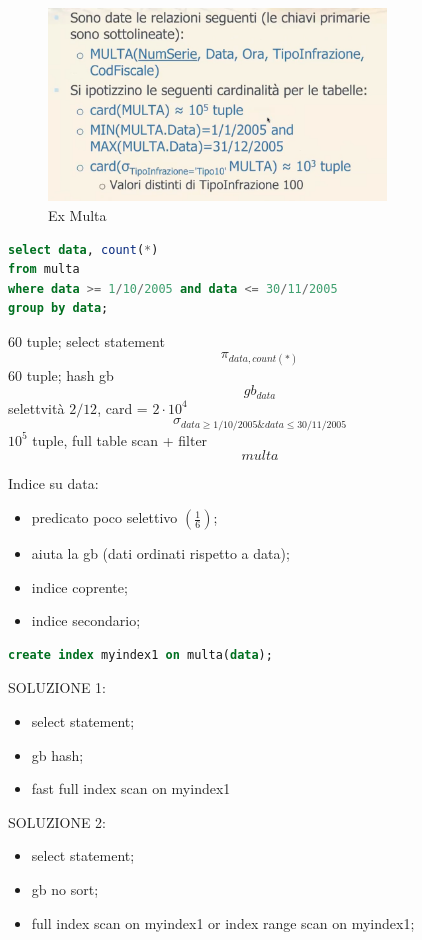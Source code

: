 \documentclass[12pt]{article}
\begin{document}
\begin{example}{}{}
    \begin{figure}[H]
        \centering
        \includegraphics[width=0.8\textwidth]{ex-multa.png}
        \caption{Ex Multa}
        \label{fig:ex-multa}
    \end{figure}
    
\begin{lstlisting}[language=sql]
select data, count(*)
from multa
where data >= 1/10/2005 and data <= 30/11/2005
group by data;
\end{lstlisting}

60 tuple; select statement
\[ \pi_{data, count(*)} \]
60 tuple; hash gb
\[ gb_{data} \]
selettvit\`a $2/12$, card = $2\cdot 10^{4}$
\[ \sigma_{data \geqslant  1/10/2005 \& data \leqslant 30/11/2005} \]
$10^{5}$ tuple, full table scan + filter
\[ multa \]

    Indice su data:
    \begin{itemize}
        \item predicato poco selettivo $(\frac{1}{6})$;
        \item aiuta la gb (dati ordinati rispetto a data);
        \item indice coprente;
        \item indice secondario;
    \end{itemize}
\begin{lstlisting}[language=sql]
create index myindex1 on multa(data);
\end{lstlisting}

    SOLUZIONE 1:
    \begin{itemize}
        \item select statement;
        \item gb hash;
        \item fast full index scan on myindex1
    \end{itemize}

    SOLUZIONE 2:
    \begin{itemize}
        \item select statement;
        \item gb no sort;
        \item full index scan on myindex1 or index range scan on myindex1;
    \end{itemize}

\end{example}
\end{document}
